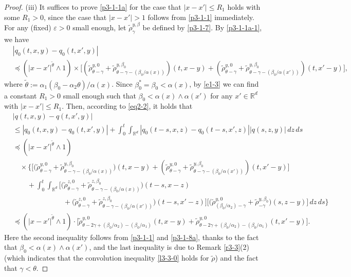 \documentclass[a4paper,11pt]{amsart}
\renewcommand{\le}{\leqslant}
\newcommand{\R}{\mathds R}
\newcommand{\B}{\beta}
\newcommand{\T}{\theta}
\newcommand{\p}{\preceq}
\newcommand{\A}{\alpha}
\newcommand{\G}{\gamma}
\newcommand{\e}{ \varepsilon}
\theoremstyle{definition}
\begin{document}
\begin{proof}
(iii) It suffices to prove \eqref{p3-1-1a} for the case that $|x-x'|\le R_1$  holds with some $R_1>0$, since the case
that $|x-x'|>1$ follows from \eqref{p3-1-1} immediately.
For any (fixed) $\e>0$ small enough, let $\tilde \rho^{y,\B}_{\G}$ be defined by \eqref{p3-1-7}.  By \eqref{p3-1-1a-1}, we have
\begin{equation}\label{p3-1-8a}
\begin{split}
&|q_0(t,x,y)-q_0(t,x',y)|\\
&\p (|x-x'|^{\tilde \T}\wedge 1)\times \bigg[\left(\tilde \rho^{y,0}_{\theta-\gamma}+\tilde \rho^{y,\B_0}_{\theta-\gamma-({\B_0}/{\A(x)})}\right)(t,x-y)  + \left(\tilde \rho^{y,0}_{\theta-\gamma}+\tilde \rho^{y,\B_0}_{\theta-\gamma-({\B_0}/{\A(x')})}\right)(t,x'-y)\bigg],
\end{split}
\end{equation}
where $\tilde \T:=\A_1(\B_0-\A_2\theta)/{\A(x)}$. Since $\B_0^*=\B_0<\A(x)$, by  \eqref{e1-3} we can find a constant
$R_1>0$ small enough such that $\B_0< \A(x)\wedge\A(x')$ for any $x'\in \R^d$ with $|x-x'|\le R_1$.
Then, according to \eqref{eq2-2}, it holds that
\begin{align*}
&|q(t,x,y)-q(t,x',y)|\\
&\le |q_0(t,x,y)-q_0(t,x',y)|+\int_0^t\int_{\R^d}
|q_0(t-s,x,z)-q_0(t-s,x',z)||q(s,z,y)|\,dz\,ds\\
&\p (|x-x'|^{\tilde \T}\wedge 1)\\
&\quad\times\bigg\{ \Big[\big(\tilde \rho^{y,0}_{\theta-\gamma}+\tilde \rho^{y,\B_0}_{\theta-\gamma-({\B_0}/{\A(x)})}\big)(t,x-y)
+ \left(\tilde \rho^{y,0}_{\theta-\gamma}+\tilde \rho^{y,\B_0}_{\theta-\gamma-({\B_0}/{\A(x')})}\right)(t,x'-y)\Big]\\
&\quad \quad+\int_0^t\int_{\R^d} \Big[\big(\tilde \rho^{z,0}_{\theta-\gamma}+\tilde \rho^{z,\B_0}_{\theta-\gamma-({\B_0}/{\A(x)})}\big)(t-s,x-z)\\
&\qquad\qquad\quad\qquad+ \big(\tilde \rho^{z,0}_{\theta-\gamma}+\tilde \rho^{z,\B_0}_{\theta-\gamma-({\B_0}/{\A(x')})}
\big)(t-s,x'-z)\Big]
\Big[\big(
\tilde \rho^{y,0}_{({\B_0}/{\A_2})-\G}+\tilde \rho^{y,\B_0}_{-\G}\big)(s,z-y)\Big]\,dz\,ds \bigg\}\\
&\p (|x-x'|^{\tilde \T}\wedge 1)\cdot\Big[\tilde \rho^{y,0}_{\theta-2\gamma
+(\B_0/\A_2)-(\B_0/\A_1)}(t,x-y)
+ \tilde \rho^{y,0}_{\theta-2\gamma+(\B_0/\A_2)-(\B_0/\A_1)}(t,x'-y)\Big].
\end{align*}
Here the second inequality follows from \eqref{p3-1-1} and \eqref{p3-1-8a}, thanks to the fact that
$\B_0< \A(x)\wedge \A(x')$, and the last inequality is due to Remark \ref{r3-3}(2) (which indicates that the convolution inequality \eqref{l3-3-0} holds for $\tilde \rho$) and the fact that $\gamma<\theta$.




\end{proof}
\end{document}
